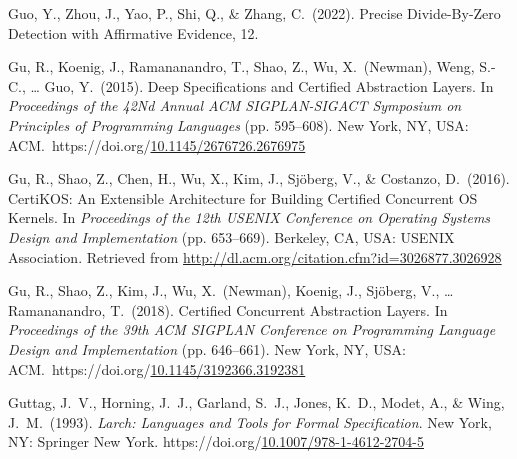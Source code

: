 \documentclass[12pt,twoside]{article}
\begin{document}
{\begin{thebibliography}{1079}
\mdbibitemlabel{}Guo, Y., Zhou, J., Yao, P., Shi, Q., \& Zhang, C.~(2022). Precise Divide-By-Zero Detection with Affirmative Evidence, 12.%

\mdbibitemlabel{}Gu, R., Koenig, J., Ramananandro, T., Shao, Z., Wu, X.~(Newman), Weng, S.-C., … Guo, Y.~(2015). Deep Specifications and Certified Abstraction Layers. In \emph{Proceedings of the 42Nd Annual ACM SIGPLAN-SIGACT Symposium on Principles of Programming Languages} (pp. 595–608). New York, NY, USA: ACM.~https://doi.org/\href{https://dx.doi.org/10.1145/2676726.2676975}{10.1145/2676726.2676975}%

\mdbibitemlabel{}Gu, R., Shao, Z., Chen, H., Wu, X., Kim, J., Sjöberg, V., \& Costanzo, D.~(2016). CertiKOS: An Extensible Architecture for Building Certified Concurrent OS Kernels. In \emph{Proceedings of the 12th USENIX Conference on Operating Systems Design and Implementation} (pp. 653–669). Berkeley, CA, USA: USENIX Association. Retrieved from \href{http://dl.acm.org/citation.cfm?id=3026877.3026928}{{\ttfamily http://\hspace{0pt}dl.\hspace{0pt}acm.\hspace{0pt}org/\hspace{0pt}citation.\hspace{0pt}cfm?\hspace{0pt}id=\hspace{0pt}3026877.\hspace{0pt}3026928}}%

\mdbibitemlabel{}Gu, R., Shao, Z., Kim, J., Wu, X.~(Newman), Koenig, J., Sjöberg, V., … Ramananandro, T.~(2018). Certified Concurrent Abstraction Layers. In \emph{Proceedings of the 39th ACM SIGPLAN Conference on Programming Language Design and Implementation} (pp. 646–661). New York, NY, USA: ACM.~https://doi.org/\href{https://dx.doi.org/10.1145/3192366.3192381}{10.1145/3192366.3192381}%

\mdbibitemlabel{}Guttag, J.~V., Horning, J.~J., Garland, S.~J., Jones, K.~D., Modet, A., \& Wing, J.~M.~(1993). \emph{Larch: Languages and Tools for Formal Specification}. New York, NY: Springer New York. https://doi.org/\href{https://dx.doi.org/10.1007/978-1-4612-2704-5}{10.1007/978-1-4612-2704-5}%


\end{thebibliography}}
\end{document}
